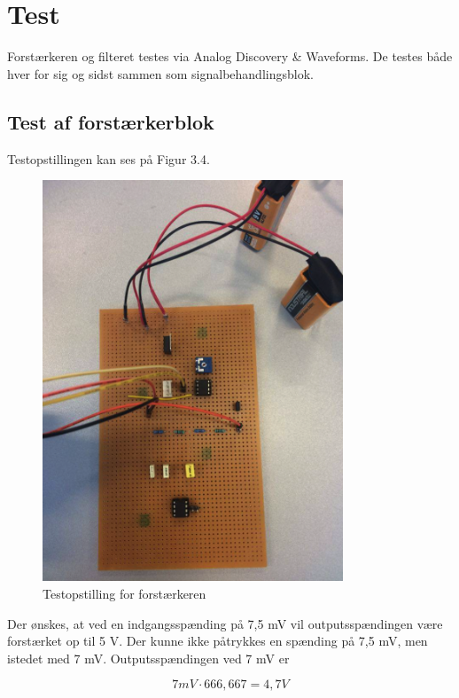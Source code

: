 \section{Test}
Forstærkeren og filteret testes via Analog Discovery \& Waveforms. De testes både hver for sig og sidst sammen som signalbehandlingsblok.\\ 

\subsection{Test af forstærkerblok}
Testopstillingen kan ses på Figur 3.4. 

\begin{figure}[H]
	\centering
	\includegraphics[width=0.8\textwidth]{Figurer/Snip20151207_35}
	\caption{Testopstilling for forstærkeren}
\end{figure}

Der ønskes, at ved en indgangsspænding på 7,5 mV vil outputsspændingen være forstærket op til 5 V. Der kunne ikke påtrykkes en spænding på 7,5 mV, men istedet med 7 mV. Outputsspændingen ved 7 mV er 

\begin{equation}
	7 mV \cdot 666,667 = 4,7 V
\end{equation} 

